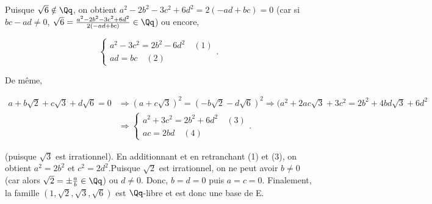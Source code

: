 {\begin{enumerate}
{Puisque $\sqrt{6}\notin\Qq$, on obtient $a^2-2b^2-3c^2+6d^2=2(-ad+bc)=0$ (car si $bc-ad\neq0$,
$\sqrt{6}=\frac{a^2-2b^2-3c^2+6d^2}{2(-ad+bc)}\in\Qq$) ou encore,

$$\left\{
\begin{array}{l}
a^2-3c^2=2b^2-6d^2\quad(1)\\
ad=bc\quad(2)
\end{array}
\right..$$

De même,

\begin{align*}
a+b\sqrt{2}+c\sqrt{3}+d\sqrt{6}=0&\Rightarrow(a+c\sqrt{3})^2=(-b\sqrt{2}-d\sqrt{6})^2
\Rightarrow(a^2+2ac\sqrt{3}+3c^2=2b^2+4bd\sqrt{3}+6d^2\\
 &\Rightarrow\left\{
\begin{array}{l}
a^2+3c^2=2b^2+6d^2\quad(3)\\
ac=2bd\quad(4)
\end{array}
\right..
\end{align*}

(puisque $\sqrt{3}$ est irrationnel). En additionnant et en retranchant (1) et (3), on obtient $a^2=2b^2$ et
$c^2=2d^2$.Puisque $\sqrt{2}$ est irrationnel, on ne peut avoir $b\neq0$ (car alors $\sqrt{2}=\pm\frac{a}{b}\in\Qq$) 
ou $d\neq0$. Donc, $b=d=0$ puis  $a=c=0$. Finalement, la famille $(1,\sqrt{2},\sqrt{3},\sqrt{6})$ est $\Qq$-libre et
est donc une base de E.}
\end{enumerate}
}

